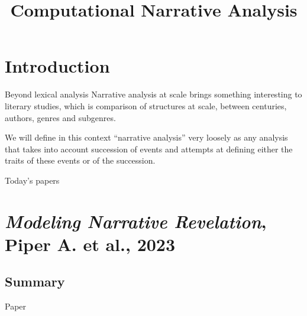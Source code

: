 \documentclass[aspectratio=169]{beamer}
\title[Intro to CH]{Computational Narrative Analysis}
\begin{document}
\frame{\titlepage}

\section{Introduction}

\begin{frame}{Beyond lexical analysis}
    Narrative analysis at scale brings something interesting to literary studies, which is comparison of structures at scale, between centuries, authors, genres and subgenres.

    \vspace{2em}

    We will define in this context ``narrative analysis'' very loosely as any analysis that takes into account succession of events and attempts at defining either the traits of these events or of the succession. 
\end{frame}

\begin{frame}{Today's papers}

    \vspace{2em}
\end{frame}

\section{\textit{Modeling Narrative Revelation}, Piper A. et al., 2023}

\subsection{Summary}

\begin{frame}{Paper}
\end{frame}
\end{document}
